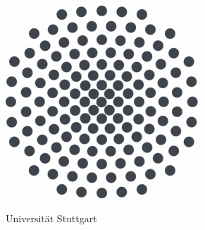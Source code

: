 \begin{titlepage}
\begin{minipage}[c]{105mm}
		\begin{minipage}[c]{4\baselineskip}
			\vspace{-1mm}
			\includegraphics[height=3.5\baselineskip]{unistuttgart_logo_de.jpg}
		\end{minipage}
		\begin{minipage}[c]{90mm}
			\small \textsf{Universität Stuttgart} \\
    		\small \textsf{\Institut} \\
    		\small \textsf{\ProfEins} \\
    		\small \textsf{\ProfZwei} 
		\end{minipage}

	\end{minipage}
	\cleardoublepage
\end{titlepage}
